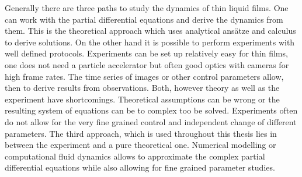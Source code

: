 Generally there are three paths to study the dynamics of thin liquid films.
One can work with the partial differential equations and derive the dynamics from them. 
This is the theoretical approach which uses analytical ansätze and calculus to derive solutions.
On the other hand it is possible to perform experiments with well defined protocols.
Experiments can be set up relatively easy for thin films, one does not need a particle accelerator but often good optics with cameras for high frame rates. 
The time series of images or other control parameters allow, then to derive results from observations.
Both, however theory as well as the experiment have shortcomings. 
Theoretical assumptions can be wrong or the resulting system of equations can be to complex too be solved. 
Experiments often do not allow for the very fine grained control and independent change of different parameters.
The third approach, which is used throughout this thesis lies in between the experiment and a pure theoretical one.
Numerical modelling or computational fluid dynamics allows to approximate the complex partial differential equations while also allowing for fine grained parameter studies.

